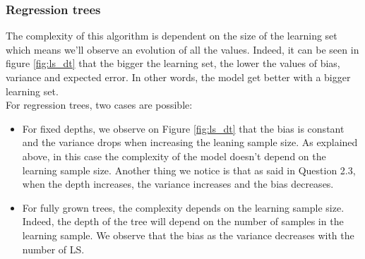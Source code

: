\documentclass[12pt,titlepage]{article}
\begin{document}
\subsubsection{Regression trees}
The complexity of this algorithm is dependent on the size of the learning set which means we’ll observe an evolution of all the values. Indeed, it can be seen in figure \ref{fig:ls_dt} that the
bigger the learning set, the lower the values of bias, variance and expected error. 
In other words, the model get better with a bigger learning set. \\
For regression trees, two cases are possible:
\begin{itemize}
    \item 
    For fixed depths, we observe on Figure \ref{fig:ls_dt} that the bias is constant and the variance drops when increasing the leaning sample size. As explained above, in this case the complexity of the model doesn’t depend on the learning sample size. Another thing we notice is that as said in Question 2.3, when the depth increases, the variance increases and the bias decreases.

    \vspace{0.3cm}

    \item 
    For fully grown trees, the complexity depends on the learning sample size. Indeed, the depth of the tree will depend on the number of samples in the learning sample. We observe that the bias as the variance decreases with the number of LS.
\end{itemize}
\end{document}
